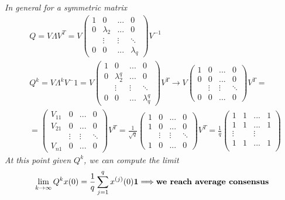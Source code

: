 \textit{
    In general for a symmetric matrix 
    \begin{align*}
        &Q=V \Lambda V^{T}
         = V \begin{pmatrix}
            1&0&...&0\\
            0&\lambda_2&...&0\\
            &\vdots&\vdots&\ddots\\
            0&0&...&\lambda_q
         \end{pmatrix} V^{-1}\\
         &Q^{k}=V \Lambda^k V^-1 = V \begin{pmatrix}
            1&0&...&0\\
            0&\lambda_2^q&...&0\\
            &\vdots&\vdots&\ddots\\
            0&0&...&\lambda_q^q
        \end{pmatrix} V^{T} \to
        V \begin{pmatrix}
            1&0&...&0\\
            0&0&...&0\\
            &\vdots&\vdots&\ddots\\
            0&0&...&0
        \end{pmatrix} V^{T}=\\
        &=\begin{pmatrix}
            V_{11}&0&...&0\\
            V_{21}&0&...&0\\
            &\vdots&\vdots&\ddots\\
            V_{n1}&0&...&0
        \end{pmatrix} V^{T}=\frac{1}{\sqrt{q}}\begin{pmatrix}
            1&0&...&0\\
            1&0&...&0\\
            &\vdots&\vdots&\ddots\\
            1&0&...&0
        \end{pmatrix} V^{T}=\frac{1}{q}
        \begin{pmatrix}
            1&1&...&1\\
            1&1&...&1\\
            \vdots& & \vdots\\
            1&1&...&1\\
        \end{pmatrix}
    \end{align*} 
    At this point given $Q^k$, we can compute the limit
    \begin{equation*}
        \lim_{k\to\infty} Q^kx(0)=\frac{1}{q}\sum_{j=1}^q x^{(j)}(0) \mathbf{1} \Longrightarrow \text{\textbf{we reach average consensus}}
    \end{equation*}
}

